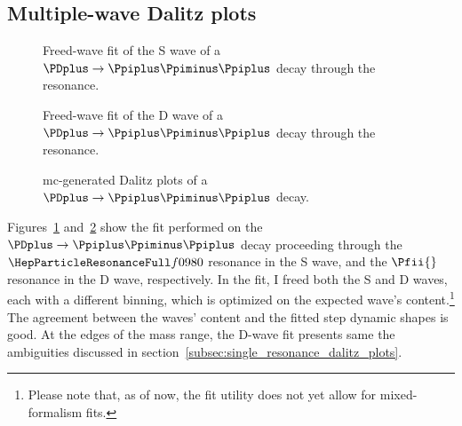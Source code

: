\subsection{Multiple-wave Dalitz plots}

    \begin{figure}
        \centering

        \subfloat[][\label{fig:f0_phase_fit}]{}

        \subfloat[][]{}

        \caption{Freed-wave fit of the S wave of a $\PDplus \to \Ppiplus\Ppiminus\Ppiplus$ decay through the \Pfnez{} resonance.~\Square} 
        \label{fig:f0_f2:f0_fit}
    \end{figure}
    \begin{figure}
        \centering

        \subfloat[][]{}

        \subfloat[][\label{fig:f0_f2:f2_amplitude}]{}

        \caption{Freed-wave fit of the D wave of a $\PDplus \to \Ppiplus\Ppiminus\Ppiplus$ decay through the \Pfii{} resonance.~\Square}
        \label{fig:f0_f2:f2_fit}
    \end{figure}
    \begin{figure}
        \centering

        \caption{\ac{mc}-generated Dalitz plots of a $\PDplus \to \Ppiplus\Ppiminus\Ppiplus$ decay.~\Square}
        \label{fig:f0_f2_dalitz}
    \end{figure}
    Figures~\ref{fig:f0_f2:f0_fit} and~\ref{fig:f0_f2:f2_fit} show the fit performed on the $\PDplus\to\Ppiplus\Ppiminus\Ppiplus$ decay proceeding through the $\Pfnez{}$ resonance in the S wave, and the $\Pfii{}$ resonance in the D wave, respectively.
    In the fit, I freed both the S and D waves, each with a different binning, which is optimized on the expected wave's content.\footnote{Please note that, as of now, the fit utility does not yet allow for mixed-formalism fits.}
    The agreement between the waves' content and the fitted step dynamic shapes is good.
    At the edges of the mass range, the D-wave fit presents same the ambiguities discussed in section~\ref{subsec:single_resonance_dalitz_plots}.
